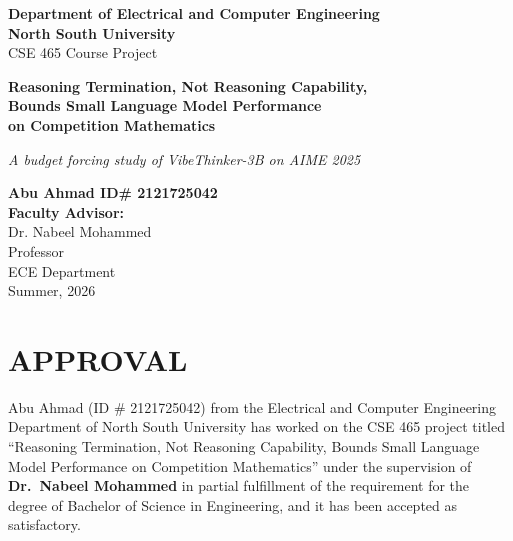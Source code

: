 \documentclass[12pt,a4paper,oneside]{report}
\begin{document}
\begin{titlepage}
\centering
\vspace*{0.5cm}

{\large\bfseries Department of Electrical and Computer Engineering}\\[4pt]
{\large\bfseries North South University}\\[30pt]

{\large CSE 465 Course Project}\\[40pt]

{\LARGE\bfseries\color{nsublue}
Reasoning Termination, Not Reasoning Capability,\\[6pt]
Bounds Small Language Model Performance\\[6pt]
on Competition Mathematics\par}

\vspace{12pt}
{\large\itshape A budget forcing study of VibeThinker-3B on AIME 2025\par}

\vspace{50pt}
{\large\bfseries Abu Ahmad \quad ID\# 2121725042}\\[60pt]

{\large\bfseries Faculty Advisor:}\\[8pt]
{\large Dr. Nabeel Mohammed}\\[4pt]
{\large Professor}\\[4pt]
{\large ECE Department}\\[30pt]

{\large Summer, 2026}
\vfill
\end{titlepage}

\chapter*{APPROVAL}

Abu Ahmad (ID \# 2121725042) from the Electrical and Computer Engineering
Department of North South University has worked on the CSE 465 project titled
``Reasoning Termination, Not Reasoning Capability, Bounds Small Language Model
Performance on Competition Mathematics'' under the supervision of
\textbf{Dr.\ Nabeel Mohammed} in partial fulfillment of the requirement for the
degree of Bachelor of Science in Engineering, and it has been accepted as
satisfactory.
\end{document}
